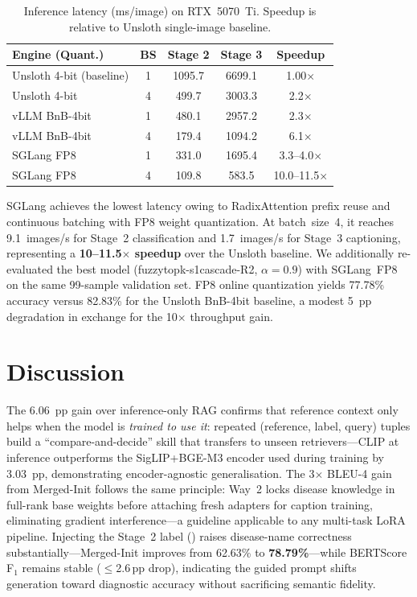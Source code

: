 \documentclass[conference,a4paper]{IEEEtran}
\newcommand{\cmark}{\ding{51}}%
\begin{document}
\begin{table}[!ht]
\centering
\caption{Inference latency (ms/image) on RTX~5070~Ti.
Speedup is relative to Unsloth single-image baseline.}
\label{tab:speed}
\begin{tabular}{lcccc}
\hline
\textbf{Engine (Quant.)} & \textbf{BS} &
  \textbf{Stage 2} & \textbf{Stage 3} & \textbf{Speedup} \\
\hline
Unsloth 4-bit (baseline)  & 1 & 1095.7 & 6699.1 & 1.00$\times$ \\
Unsloth 4-bit             & 4 &  499.7 & 3003.3 & 2.2$\times$ \\
vLLM BnB-4bit             & 1 &  480.1 & 2957.2 & 2.3$\times$ \\
vLLM BnB-4bit             & 4 &  179.4 & 1094.2 & 6.1$\times$ \\
SGLang FP8                & 1 &  331.0 & 1695.4 & 3.3--4.0$\times$ \\
SGLang FP8                & 4 &  109.8 &  583.5 & 10.0--11.5$\times$ \\
\hline
\end{tabular}
\end{table}

SGLang achieves the lowest latency owing to RadixAttention prefix
reuse and continuous batching with FP8 weight quantization.  At
batch~size~4, it reaches 9.1~images/s for Stage~2 classification and
1.7~images/s for Stage~3 captioning, representing a \textbf{10--11.5$\times$
speedup} over the Unsloth baseline.
We additionally re-evaluated the best model (fuzzytopk-s1cascade-R2,
$\alpha{=}0.9$) with SGLang~FP8 on the same 99-sample validation set.
FP8 online quantization yields 77.78\% accuracy versus 82.83\% for the
Unsloth BnB-4bit baseline, a modest 5~pp degradation in exchange for
the 10$\times$ throughput gain.

\section{Discussion}

The 6.06~pp gain over inference-only RAG confirms that reference context
only helps when the model is \textit{trained to use it}: repeated
(reference, label, query) tuples build a ``compare-and-decide'' skill that
transfers to unseen retrievers---CLIP at inference outperforms the
SigLIP+BGE-M3 encoder used during training by 3.03~pp, demonstrating
encoder-agnostic generalisation.
The 3$\times$ BLEU-4 gain from Merged-Init follows the same principle:
Way~2 locks disease knowledge in full-rank base weights before attaching
fresh adapters for caption training, eliminating gradient interference---a
guideline applicable to any multi-task LoRA pipeline.
Injecting the Stage~2 label (\cmark) raises disease-name correctness
substantially---Merged-Init improves from 62.63\% to \textbf{78.79\%}---while
BERTScore F$_1$ remains stable ($\leq$2.6\,pp drop), indicating the guided
prompt shifts generation toward diagnostic accuracy without sacrificing
semantic fidelity.
\end{document}
